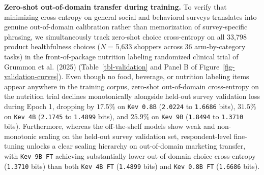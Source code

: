 \documentclass[
  letterpaper,
  DIV=11,
  numbers=noendperiod]{scrartcl}
\begin{document}
\textbf{Zero-shot out-of-domain transfer during training.} To verify
that minimizing cross-entropy on general social and behavioral surveys
translates into genuine out-of-domain calibration rather than
memorization of survey-specific phrasing, we simultaneously track
zero-shot choice cross-entropy on all 33,798 product healthfulness
choices (\emph{N} = 5,633 shoppers across \(36\) arm-by-category tasks)
in the front-of-package nutrition labeling randomized clinical trial of
Grummon et al. (2025) (Table~\ref{tbl-validation} and Panel B of
Figure~\ref{fig-validation-curves}). Even though no food, beverage, or
nutrition labeling items appear anywhere in the training corpus,
zero-shot out-of-domain cross-entropy on the nutrition trial declines
monotonically alongside held-out survey validation loss during Epoch 1,
dropping by \(17.5\%\) on \texttt{Kev\ 0.8B} (\texttt{2.0224} to
\texttt{1.6686} bits), \(31.5\%\) on \texttt{Kev\ 4B} (\texttt{2.1745}
to \texttt{1.4899} bits), and \(25.9\%\) on \texttt{Kev\ 9B}
(\texttt{1.8494} to \texttt{1.3710} bits). Furthermore, whereas the
off-the-shelf models show weak and non-monotonic scaling on the held-out
survey validation set, respondent-level fine-tuning unlocks a clear
scaling hierarchy on out-of-domain marketing transfer, with
\texttt{Kev\ 9B\ FT} achieving substantially lower out-of-domain choice
cross-entropy (\texttt{1.3710} bits) than both \texttt{Kev\ 4B\ FT}
(\texttt{1.4899} bits) and \texttt{Kev\ 0.8B\ FT} (\texttt{1.6686}
bits).
\end{document}
